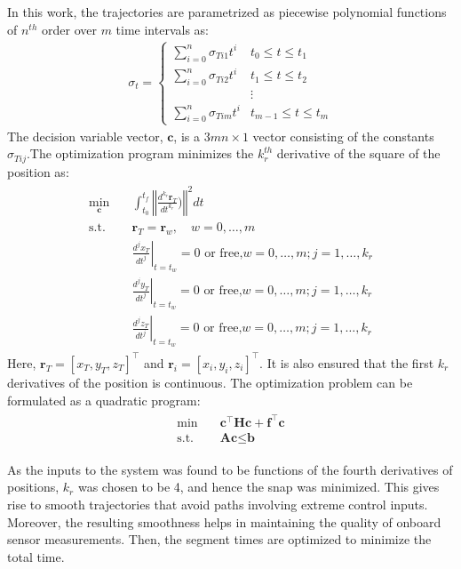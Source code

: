 In this work, the trajectories are parametrized as piecewise polynomial functions of $n^{th}$ order over $m$ time intervals as:
\begin{align}
  \sigma_{t} =
    \begin{cases}
      \sum_{i=0}^n \sigma_{Ti1}t^i& t_0\leq t\leq t_1\\
      \sum_{i=0}^n \sigma_{Ti2}t^i& t_1\leq t\leq t_2\\
      &\vdots\\
      \sum_{i=0}^n \sigma_{Tim}t^i& t_{m-1}\leq t\leq t_m
    \end{cases} 
\end{align}
The decision variable vector, $\textbf{c}$, is a $3mn\times 1$ vector consisting of the constants $\sigma_{T{ij}}$.The optimization program minimizes the $k_r^{th}$ derivative of the square of the position as:
\begin{align}
\begin{split}
\min_{\textbf{c}} \quad & \int_{t_0}^{t_f} \left\Vert\frac{d^{k_r}\textbf{r}_T}{dt^{k_r}})\right\Vert^2 dt\\
\textrm{s.t.} \quad & \textbf{r}_{T}=\textbf{r}_w, \quad w=0,\ldots,m\\
  &\left.\frac{d^j x_T}{dt^j}\right\rvert_{t=t_w}=0\text{ or free,}w=0,\ldots,m;j=1,\ldots,k_r\\
  &\left.\frac{d^j y_T}{dt^j}\right\rvert_{t=t_w}=0\text{ or free,}w=0,\ldots,m;j=1,\ldots,k_r\\
  &\left.\frac{d^j z_T}{dt^j}\right\rvert_{t=t_w}=0\text{ or free,}w=0,\ldots,m;j=1,\ldots,k_r
\end{split}
\end{align}
Here, $\textbf{r}_T=[x_T,y_T,z_T]^\top$ and $\textbf{r}_i=[x_i,y_i,z_i]^\top$. It is also ensured that the first $k_r$ derivatives of the position is continuous. The optimization problem can be formulated as a quadratic program:
\begin{align}
\begin{split}
\min \quad & \textbf{c}^\top \textbf{H} \textbf{c} + \textbf{f}^\top\textbf{c} \\
\textrm{s.t.} \quad &\textbf{Ac}\leq \textbf{b}
\end{split}
\end{align}

As the inputs to the system was found to be functions of the fourth derivatives of positions, $k_r$ was chosen to be 4, and hence the snap was minimized. This gives rise to smooth trajectories that avoid paths involving extreme control inputs. Moreover, the resulting smoothness helps in maintaining the quality of onboard sensor measurements. Then, the segment times are optimized to minimize the total time. 

